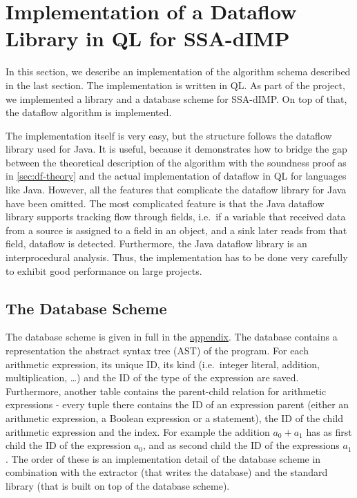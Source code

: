 \section{Implementation of a Dataflow Library in QL for SSA-dIMP}

In this section, we describe an implementation of the algorithm schema described in the
last section.
The implementation is written in QL.
As part of the project, we implemented a library and a database scheme for SSA-dIMP.
On top of that, the dataflow algorithm is implemented.

The implementation itself is very easy, but the structure follows the
dataflow library used for Java.
It is useful, because it demonstrates how to bridge the gap between
the theoretical description of the algorithm with the soundness proof
as in \autoref{sec:df-theory} and the actual implementation of dataflow
in QL for languages like Java.
However, all the features that complicate the dataflow library for Java have been 
omitted.
The most complicated feature is that the Java dataflow library supports tracking 
flow through fields, i.e.\ if a variable that received data from a source 
is assigned to a field in an object, and a sink later reads from that field,
dataflow is detected.
Furthermore, the Java dataflow library is an interprocedural analysis.
Thus, the implementation has to be done very carefully to exhibit good
performance on large projects.

\subsection{The Database Scheme}
The database scheme is given in full in the \hyperref[lst:dbscheme]{appendix}.
The database contains a representation the abstract syntax tree (AST) of the program.
For each arithmetic expression, its unique ID, its kind
(i.e.\ integer literal, addition, multiplication, \ldots) 
and the ID of the type of the expression are saved.
Furthermore, another table contains the parent-child relation for arithmetic 
expressions - every tuple there contains the ID of an expression parent 
(either an arithmetic expression, a Boolean expression or a statement),
the ID of the child arithmetic expression and the index.
For example the addition $a_0 + a_1$ has as first child the ID of the expression 
$a_0$, and as second child the ID of the expressions $a_1$.
The order of these is an implementation detail of the database scheme in combination
with the extractor (that writes the database) and the standard library 
(that is built on top of the database scheme).

